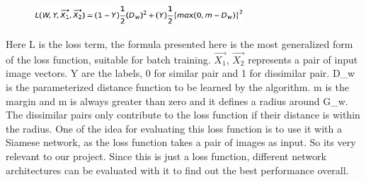 \begin{figure}[ht]
\centering
\includegraphics[height= 0.7cm]{images/contrastive/contrastive_loss_formula2.jpg}
\label{fig:contrastive_loss_formula2}
\end{figure}

Here L is the loss term, the formula presented here is the most generalized form of the loss function, suitable for batch training. 
$ \vec{X_1}$, $ \vec{X_2}$ represents a pair of input image vectors. Y are the labels, 0 for similar pair and 1 for dissimilar pair. D\_w is the parameterized distance function to be learned by the algorithm. 
m is the margin and m is always greater than zero and it defines a radius around G\_w. The dissimilar pairs only contribute to the loss function if their distance is within the radius.
One of the idea for evaluating this loss function is to use it with a Siamese network, as the loss function takes a pair of images as input. So its very relevant to our project. 
Since this is just a loss function, different network architectures can be evaluated with it to find out the best performance overall.


